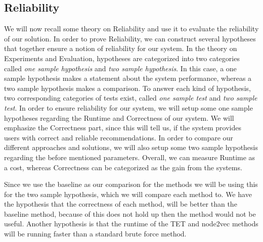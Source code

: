 \subsection{Reliability}
We will now recall some theory on Reliability and use it to evaluate the reliability of our solution. In order to prove Reliability, we can construct several hypotheses that together ensure a notion of reliability for our system. In the theory on
Experiments and Evaluation, hypotheses are categorized into two categories called \textit{one sample hypothesis} and \textit{two sample hypothesis}. In this case, a one sample hypothesis makes a statement about the system performance, whereas a two sample hypothesis makes a comparison. To answer each kind of hypothesis, two corresponding categories of tests exist, called \textit{one sample test} and \textit{two sample test}.
In order to ensure reliability for our system, we will setup some one sample hypotheses regarding the Runtime and Correctness of our system. We will emphasize the Correctness part, since this will tell us, if the system provides users with correct and reliable recommendations. In order to compare our different approaches and solutions, we will also setup some two sample hypothesis regarding the before mentioned parameters. Overall, we can measure Runtime as a cost, whereas Correctness can be categorized as the gain from the systems.

Since we use the baseline as our comparison for the methods we will be using this for the two sample hypothesis, which we will compare each method to. 
We have the hypothesis that the correctness of each method, will be better than the baseline method, because of this does not hold up then the method would not be useful.
Another hypothesis is that the runtime of the TET and node2vec methods will be running faster than a standard brute force method.




